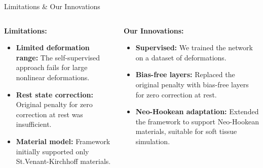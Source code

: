 \documentclass[9pt]{beamer}
\begin{document}
\begin{frame}{Limitations \& Our Innovations}
    \begin{columns}[T]
        \begin{column}{0.5\textwidth}
            \textbf{Limitations:}
            \begin{itemize}
                \item \textbf{Limited deformation range:} The self-supervised approach fails for large nonlinear deformations.
                \item \textbf{Rest state correction:} Original penalty for zero correction at rest was insufficient.
                \item \textbf{Material model:} Framework initially supported only St.Venant-Kirchhoff materials.
            \end{itemize}
        \end{column}
        \begin{column}{0.5\textwidth}
            \textbf{Our Innovations:}
            \begin{itemize}
                \item \textbf{Supervised:} We trained the network on a dataset of deformations.
                \item \textbf{Bias-free layers:} Replaced the original penalty with bias-free layers for zero correction at rest.
                \item \textbf{Neo-Hookean adaptation:} Extended the framework to support Neo-Hookean materials, suitable for soft tissue simulation.
            \end{itemize}
        \end{column}
    \end{columns}
\end{frame}




    
    
\end{document}
